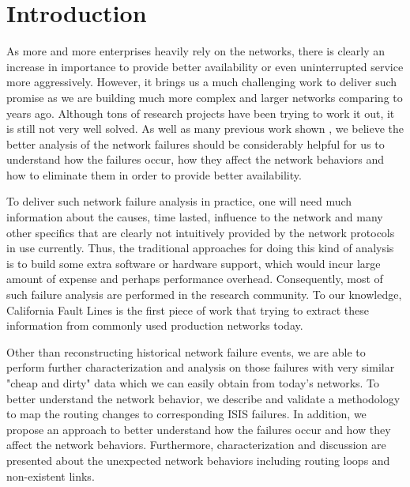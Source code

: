 \documentclass[conference, twocolumn, oneside, 10pt]{IEEEtran}
\begin{document}
\section{Introduction}
\label{sec:sec1}

As more and more enterprises heavily rely on the networks, there is clearly an increase in importance to provide better availability or even uninterrupted service more aggressively. However, it brings us a much challenging work to deliver such promise as we are building much more complex and larger networks comparing to years ago. Although tons of research projects have been trying to work it out, it is still not very well solved. As well as many previous work shown \cite{labovitz1999experimental, markopoulou2008characterization, padmanabhan2006study}, we believe the better analysis of the network failures should be considerably helpful for us to understand how the failures occur, how they affect the network behaviors and how to eliminate them in order to provide better availability.

To deliver such network failure analysis in practice, one will need much information about the causes, time lasted, influence to the network and many other specifics that are clearly not intuitively provided by the network protocols in use currently. Thus, the traditional approaches \cite{paxson1997end, cunha2011predicting} for doing this kind of analysis is to build some extra software or hardware support, which would incur large amount of expense and perhaps performance overhead. Consequently, most of such failure analysis are performed in the research community. To our knowledge, California Fault Lines \cite{turner2010california} is the first piece of work that trying to extract these information from commonly used production networks today.

Other than reconstructing historical network failure events, we are able to perform further characterization and analysis on those failures with very similar "cheap and dirty" data which we can easily obtain from today's networks. To better understand the network behavior, we describe and validate a methodology to map the routing changes to corresponding ISIS failures. In addition, we propose an approach to better understand how the failures occur and how they affect the network behaviors. Furthermore, characterization and discussion are presented about the unexpected network behaviors including routing loops and non-existent links.
\end{document}
